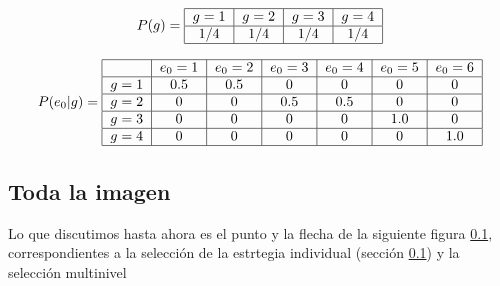 \documentclass[a4paper,10pt]{article}
\begin{document}
\begin{align}
\centering
P(g) = \begin{tabular}{|c|c|c|c|}
        \hline
        $g=1$ & $g=2$ & $g=3$  & $g=4$\\ \hline
        $1/4$ & $1/4$ & $1/4$ & $1/4$ \\ \hline
\end{tabular}
\end{align}

\begin{align}
\centering
P(e_0|g) = \begin{tabular}{|c|c|c|c|c|c|c|}
        \hline
        & $e_0=1$ & $e_0=2$ & $e_0=3$ &  $e_0=4$ & $e_0=5$ & $e_0=6$ \\ \hline
       $g=1$ & $0.5$ & $0.5$ & $0$ &  $0$ & $0$ & $0$ \\ \hline
       $g=2$ & $0$ & $0$ & $0.5$ & $0.5$ & $0$ & $0$ \\ \hline
       $g=3$ & $0$ & $0$ & $0$ & $0$ & $1.0$ & $0$ \\ \hline
       $g=4$ & $0$ & $0$ & $0$ & $0$ & $0$ & $1.0$ \\ \hline
\end{tabular}
\end{align}





\begin{figure}[H]
\centering
{}
\caption{}
\label{fig:modelo_grafico}
\end{figure}




\subsection{Toda la imagen}

Lo que discutimos hasta ahora es el punto y la flecha de la siguiente figura \ref{}, correspondientes a la selección de la estrtegia individual (sección \ref{}) y la selección multinivel 
\end{document}
